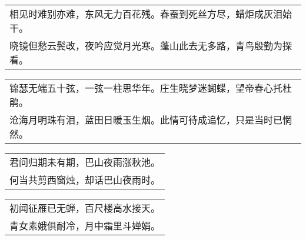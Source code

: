 \nopagebreak%
\nopagebreak%
\noindent\begin{minipage}{\linewidth}
  \vskip-3pt\begin{table}[H]
    \centering
    \begin{tabular}{@{}l@{}}
相见时难别亦难，东风无力百花残。春蚕到死丝方尽，蜡炬成灰泪始干。\\
晓镜但愁云鬓改，夜吟应觉月光寒。蓬山此去无多路，青鸟殷勤为探看。
    \end{tabular}
  \end{table}
\end{minipage}
\vspace{1cm}


\nopagebreak%
\nopagebreak%
\noindent\begin{minipage}{\linewidth}
  \vskip-3pt\begin{table}[H]
    \centering
    \begin{tabular}{@{}l@{}}
锦瑟无端五十弦，一弦一柱思华年。庄生晓梦迷蝴蝶，望帝春心托杜鹃。\\
沧海月明珠有泪，蓝田日暖玉生烟。此情可待成追忆，只是当时已惘然。
    \end{tabular}
  \end{table}
\end{minipage}
\vspace{1cm}


\nopagebreak%
\nopagebreak%
\noindent\begin{minipage}{\linewidth}
  \vskip-3pt\begin{table}[H]
    \centering
    \begin{tabular}{@{}l@{}}
君问归期未有期，巴山夜雨涨秋池。\\
何当共剪西窗烛，却话巴山夜雨时。
    \end{tabular}
  \end{table}
\end{minipage}
\vspace{1cm}


\nopagebreak%
\nopagebreak%
\noindent\begin{minipage}{\linewidth}
  \vskip-3pt\begin{table}[H]
    \centering
    \begin{tabular}{@{}l@{}}
初闻征雁已无蝉，百尺楼高水接天。\\
青女素娥俱耐冷，月中霜里斗婵娟。
    \end{tabular}
  \end{table}
\end{minipage}
\vspace{1cm}


